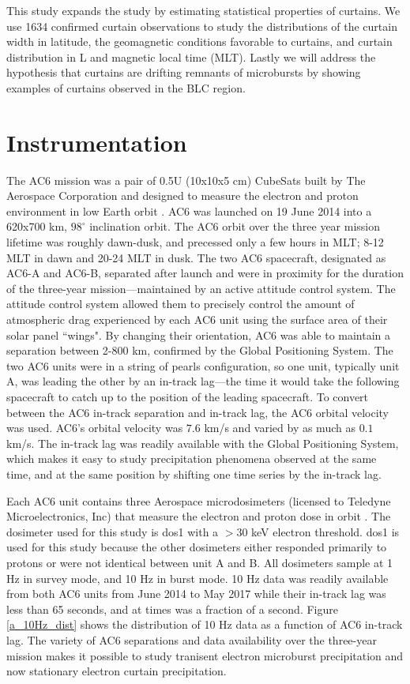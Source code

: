 \documentclass[draft]{agujournal2019}
\begin{document}
This study expands the  study by estimating statistical properties of curtains. We use 1634 confirmed curtain observations to study the distributions of the curtain width in latitude, the geomagnetic conditions favorable to curtains, and curtain distribution in L and magnetic local time (MLT). Lastly we will address the hypothesis that curtains are drifting remnants of microbursts by showing examples of curtains observed in the BLC region.

\section{Instrumentation} \label{instrumentation}
The AC6 mission was a pair of 0.5U (10x10x5 cm) CubeSats built by The Aerospace Corporation and designed to measure the electron and proton environment in low Earth orbit \cite{O'brien2016}. AC6 was launched on 19 June 2014 into a 620x700 km, $98^\circ$ inclination orbit. The AC6 orbit over the three year mission lifetime was roughly dawn-dusk, and precessed only a few hours in MLT; 8-12 MLT in dawn and 20-24 MLT in dusk. The two AC6 spacecraft, designated as AC6-A and AC6-B, separated after launch and were in proximity for the duration of the three-year mission---maintained by an active attitude control system. The attitude control system allowed them to precisely control the amount of atmospheric drag experienced by each AC6 unit using the surface area of their solar panel ``wings". By changing their orientation, AC6 was able to maintain a separation between 2-800 km, confirmed by the Global Positioning System. The two AC6 units were in a string of pearls configuration, so one unit, typically unit A, was leading the other by an in-track lag---the time it would take the following spacecraft to catch up to the position of the leading spacecraft. To convert between the AC6 in-track separation and in-track lag, the AC6 orbital velocity was used. AC6's orbital velocity was $7.6$ km/s and varied by as much as $0.1$ km/s. The in-track lag was readily available with the Global Positioning System, which makes it easy to study precipitation phenomena observed at the same time, and at the same position by shifting one time series by the in-track lag.

Each AC6 unit contains three Aerospace microdosimeters (licensed to Teledyne Microelectronics, Inc) that measure the electron and proton dose in orbit \cite{O'brien2016}. The dosimeter used for this study is dos1 with a $> 30$ keV electron threshold. dos1 is used for this study because the other dosimeters either responded primarily to protons or were not identical between unit A and B. All dosimeters sample at 1 Hz in survey mode, and 10 Hz in burst mode. 10 Hz data was readily available from both AC6 units from June 2014 to May 2017 while their in-track lag was less than 65 seconds, and at times was a fraction of a second. Figure \ref{a_10Hz_dist} shows the distribution of 10 Hz data as a function of AC6 in-track lag. The variety of AC6 separations and data availability over the three-year mission makes it possible to study tranisent electron microburst precipitation \cite{Shumko2020} and now stationary electron curtain precipitation.
\end{document}
